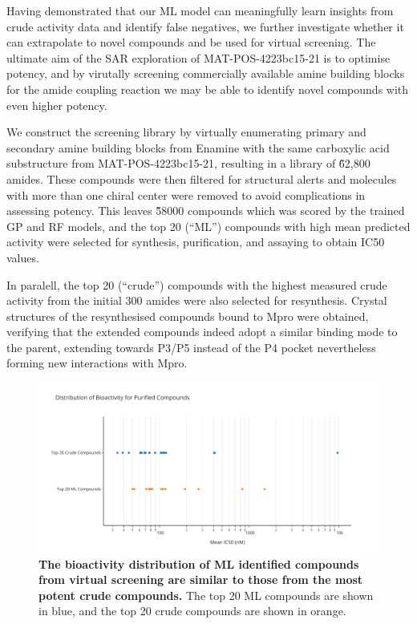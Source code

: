 Having demonstrated that our ML model can meaningfully learn insights from crude activity data and identify false negatives, we further investigate whether it can extrapolate to novel compounds and be used for virtual screening. The ultimate aim of the SAR exploration of MAT-POS-4223bc15-21 is to optimise potency, and by virutally screening commercially available amine building blocks for the amide coupling reaction we may be able to identify novel compounds with even higher potency.

We construct the screening library by virtually enumerating primary and secondary amine building blocks from Enamine with the same carboxylic acid substructure from MAT-POS-4223bc15-21, resulting in a library of \~62,800 amides. These compounds were then filtered for structural alerts and molecules with more than one chiral center were removed to avoid complications in assessing potency. This leaves \~58000 compounds which was scored by the trained GP and RF models, and the top 20 (``ML'') compounds with high mean predicted activity were selected for synthesis, purification, and assaying to obtain IC50 values.


In paralell, the top 20 (``crude'') compounds with the highest measured crude activity from the initial 300 amides were also selected for resynthesis. Crystal structures of the resynthesised compounds bound to Mpro were obtained, verifying that the extended compounds indeed adopt a similar binding mode to the parent, extending towards P3/P5 instead of the P4 pocket nevertheless forming new interactions with Mpro.

\begin{figure}[!]
    \centering
    \includegraphics[width=\textwidth]{Chapters/Crude/Figs/strip_plot.pdf}
    \caption{\textbf{The bioactivity distribution of ML identified compounds from virtual screening are similar to those from the most potent crude compounds.} The top 20 ML compounds are shown in blue, and the top 20 crude compounds are shown in orange.}
    \label{fig:strip}
\end{figure}


